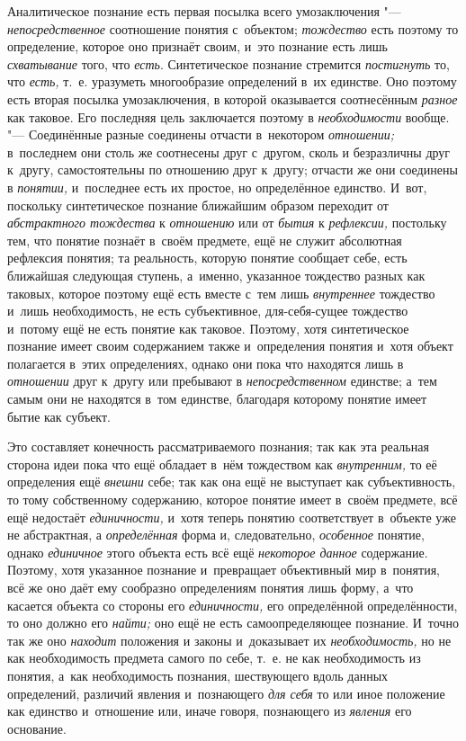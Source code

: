 
Аналитическое познание есть первая посылка всего
умозаключения "--- {\em непосредственное}
соотношение понятия с~объектом;
{\em тождество} есть
поэтому то определение, которое оно признаёт своим, и~это познание есть
лишь {\em схватывание}
того, что {\em есть}.
Синтетическое познание стремится
{\em постигнуть} то, что
{\em есть,} т.~е.
уразуметь многообразие определений в~их единстве. Оно поэтому есть вторая
посылка умозаключения, в
которой
оказывается соотнесённым
{\em разное} как таковое.
Его последняя цель заключается поэтому в
{\em необходимости}
вообще. "--- Соединённые разные соединены отчасти
в~некотором {\em отношении;}
в~последнем они столь же соотнесены друг с~другом, сколь и
безразличны друг к~другу, самостоятельны по отношению друг к~другу; отчасти
же они соединены в {\em понятии,}
и~последнее есть их простое, но определённое единство. И~вот,
поскольку синтетическое познание ближайшим образом переходит от
{\em абстрактного тождества}
к {\em отношению}
или от {\em бытия}
к {\em рефлексии,}
постольку тем, что понятие познаёт в~своём предмете, ещё не
служит абсолютная рефлексия понятия; та реальность, которую понятие
сообщает себе, есть ближайшая следующая ступень, а~именно, указанное
тождество разных как таковых, которое поэтому ещё есть вместе с~тем лишь
{\em внутреннее}
тождество и~лишь необходимость, не есть субъективное,
для-себя-сущее тождество и~потому ещё не есть понятие как таковое. Поэтому,
хотя синтетическое познание имеет своим содержанием также и~определения
понятия и~хотя объект полагается в~этих определениях, однако они пока что
находятся лишь в {\em отношении}
друг к~другу или пребывают в
{\em непосредственном}
единстве; а~тем самым они не находятся в~том единстве,
благодаря которому понятие имеет бытие как субъект.

Это составляет конечность рассматриваемого познания; так как
эта реальная сторона идеи пока что ещё обладает в~нём тождеством как
{\em внутренним,} то её
определения ещё {\em внешни}
себе; так как она ещё не выступает как субъективность, то
тому собственному содержанию, которое понятие имеет в~своём предмете, всё
ещё недостаёт {\em единичности,}
и~хотя теперь понятию соответствует в~объекте уже не
абстрактная, а {\em определённая}
форма и, следовательно,
{\em особенное} понятие,
однако {\em единичное}
этого объекта есть всё ещё
{\em некоторое данное}
содержание. Поэтому, хотя указанное познание и~превращает
объективный мир в~понятия, всё же оно даёт ему сообразно
определениям понятия лишь форму, а~что касается объекта со стороны его
{\em единичности,} его
определённой определённости, то оно должно его
{\em найти;} оно ещё не
есть самоопределяющее познание. И~точно так же оно
{\em находит} положения и
законы и~доказывает их
{\em необходимость,} но
не как необходимость предмета самого по себе, т.~е. не как необходимость из
понятия, а~как необходимость познания, шествующего вдоль данных
определений, различий явления и~познающего
{\em для себя} то или
иное положение как единство и~отношение или, иначе говоря, познающего из
{\em явления} его
основание.

